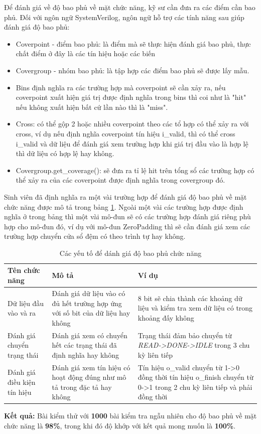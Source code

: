 Để đánh giá về độ bao phủ về mặt chức năng, kỹ sư cần đưa ra các điểm cần bao phủ. Đối với ngôn ngữ SystemVerilog, ngôn ngữ hỗ trợ các tính năng sau giúp đánh giá độ bao phủ:
\begin{itemize}
	\item Coverpoint - điểm bao phủ: là điểm mà sẽ thực hiện đánh giá bao phủ, thực chất điểm ở đây là các tín hiệu hoặc các biến
	\item Covergroup - nhóm bao phủ: là tập hợp các điểm bao phủ sẽ được lấy mẫu.
	\item Bins định nghĩa ra các trường hợp mà coverpoint sẽ cần xảy ra, nếu coverpoint xuất hiện giá trị được định nghĩa trong bins thì coi như là "hit" nếu không xuất hiện bất cứ lần nào thì là "miss".
	\item Cross: có thể gộp 2 hoặc nhiều coverpoint theo các tổ hợp có thể xảy ra với cross, ví dụ nếu định nghĩa coverpoint tín hiệu i\_valid, thì có thể cross i\_valid và dữ liệu để đánh giá xem trường hợp khi giá trị đầu vào là hợp lệ thì dữ liệu có hợp lệ hay không.
	\item Covergroup.get\_coverage(): sẽ đưa ra tỉ lệ hit trên tổng sổ các trường hợp có thể xảy ra của các coverpoint được định nghĩa trong covergroup đó.
\end{itemize}
Sinh viên đã định nghĩa ra một vài trường hợp để đánh giá độ bao phủ về mặt chức năng được mô tả trong bảng \ref{tab:myFC}. Ngoài một vài các trường hợp được định nghĩa ở trong bảng thì một vài mô-đun sẽ có các trường hợp đánh giá riêng phù hợp cho mô-đun đó, ví dụ với mô-đun ZeroPadding thì sẽ cần đánh giá xem các trường hợp chuyển cửa sổ đệm có theo trình tự hay không.

\begin{table}[H]
	\centering
	\renewcommand{\arraystretch}{1.3}
		\caption{Các yếu tố để dánh giá độ bao phủ chức năng}
	\begin{tabular}{|p{4cm} p{4cm} p{6cm}|}
		\hline
		\rowcolor{gray!30}
		\textbf{Tên chức năng} & \textbf{Mô tả}  & Ví dụ  \\
		\hline
		Dữ liệu đầu vào và ra & Đánh giá dữ liệu vào có đủ hết trường hợp ứng với số bit của dữ liệu hay không & 8 bit sẽ chia thành các khoảng dữ liệu và kiểm tra xem dữ liệu có trong khoảng đấy không
		\\ \hline
		Đánh giá chuyển trạng thái & Đánh giá xem có chuyển hết các trạng thái đã định nghĩa hay không & Trạng thái đảm bảo chuyển từ \textit{READ->DONE->IDLE} trong 3 chu kỳ liên tiếp
	
		\\ \hline
		Đánh giá điều kiện tín hiệu & Đánh giá xem tín hiệu có hoạt động đúng như mô tả trong đặc tả hay không & Tín hiệu o\_valid chuyển từ 1->0 đồng thời tín hiệu o\_finish chuyển từ 0->1 trong 2 chu kỳ liên tiếp và phải đồng thời
		\\ \hline
	\end{tabular}

	\label{tab:myFC}
\end{table}

\textbf{Kết quả: } Bài kiểm thử với \textbf{1000} bài kiểm tra ngẫu nhiên cho độ bao phủ về mặt chức năng là \textbf{98\%}, trong khi đó độ khớp với kết quả mong muốn là \textbf{100\%}.




